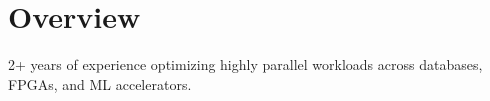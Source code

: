 \documentclass{moderncv}
\begin{document}
\makecvtitle
\begin{comment}
\section{Skills}
\begin{minipage}{0.25\textwidth}
    \begin{itemize}
        \item Java
        \item C++
        \item Python
        \item Scala
    \end{itemize}
\end{minipage}
\begin{minipage}{0.25\textwidth}
    \begin{itemize}
        \item LLVM
        \item MLIR
        \item SYCL
        \item SQL
    \end{itemizes}
\end{minipage}
\begin{minipage}{0.25\textwidth}
    \begin{itemize}
        \item PyTorch
        \item ONNX
        \item Protobuf
        \item Verilog
    \end{itemize}
\end{minipage}
\begin{minipage}{0.25\textwidth}
    \begin{itemize}
        \item Compiler Design
        \item Parallel Execution
        \item FPGA Development
        \item ML Acceleration
    \end{itemize}
\end{minipage}
\end{comment}
\section{Overview}
\begin{center}
2+ years of experience optimizing highly parallel workloads across databases, FPGAs, and ML accelerators.
\end{center}
\end{document}
